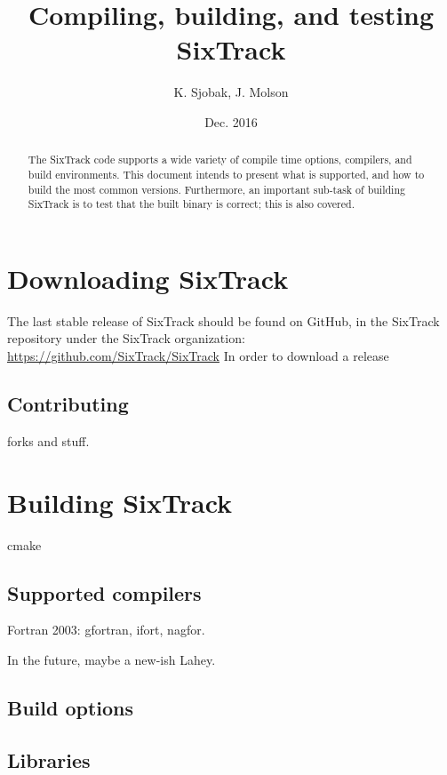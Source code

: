 \documentclass[english]{article}
\begin{document}
\author{K. Sjobak, J. Molson}
\title{Compiling, building, and testing SixTrack}
\date{Dec. 2016}

\maketitle

\begin{abstract}
  The SixTrack code supports a wide variety of compile time options,
  compilers, and build environments.
  This document intends to present what is supported, and how to build the most common versions.
  Furthermore, an important sub-task of building SixTrack is to test that the built binary is correct; this is also covered.
\end{abstract}

\tableofcontents
\newpage

\section{Downloading SixTrack}
The last stable release of SixTrack should be found on GitHub, in the SixTrack repository under the SixTrack organization:\\
\url{https://github.com/SixTrack/SixTrack}
In order to download a release

\subsection{Contributing}
forks and stuff.

\section{Building SixTrack}
cmake
\subsection{Supported compilers}
Fortran 2003: gfortran, ifort, nagfor.

In the future, maybe a new-ish Lahey.

\subsection{Build options}


\subsection{Libraries}
\end{document}
